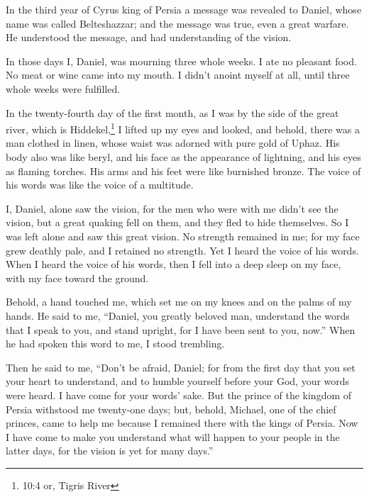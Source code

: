 \mychapter{} \myverse*{}In the third year of Cyrus king of Persia a message was revealed
to Daniel, whose name was called Belteshazzar; and the message was true, even a great warfare. He understood
the message, and had understanding of the vision.

\myverse{}In those days I, Daniel, was mourning three whole weeks.
\myverse{}I ate no pleasant food. No meat or wine came into my mouth. I didn’t anoint
myself at all, until three whole weeks were fulfilled.



\myverse{}In the twenty-fourth day of the first month, as I was by the side
of the great river, which is Hiddekel,\footnote{10:4 or, Tigris River}
\myverse{}I lifted up my eyes and looked, and behold, there was a man clothed in linen,
whose waist was adorned with pure gold of Uphaz.
\myverse{}His body also was like beryl, and his face as the appearance of lightning,
and his eyes as flaming torches. His arms and his feet were like burnished bronze. The voice of his words
was like the voice of a multitude.

\myverse{}I, Daniel, alone saw the vision, for the men who were with me
didn’t see the vision, but a great quaking fell on them, and they fled to hide themselves.
\myverse{}So I was left alone and saw this great vision. No strength remained in me;
for my face grew deathly pale, and I retained no strength.
\myverse{}Yet I heard the voice of his words. When I heard the voice of his words, then
I fell into a deep sleep on my face, with my face toward the ground.

\myverse{}Behold, a hand touched me, which set me on my knees and on the
palms of my hands.
\myverse{}He said to me, “Daniel, you greatly beloved man, understand the words that
I speak to you, and stand upright, for I have been sent to you, now.” When he had spoken this word to
me, I stood trembling.

\myverse{}Then he said to me, “Don’t be afraid, Daniel; for from the first
day that you set your heart to understand, and to humble yourself before your God, your words were heard.
I have come for your words’ sake.
\myverse{}But the prince of the kingdom of Persia withstood me twenty-one days; but,
behold, Michael, one of the chief princes, came to help me because I remained there with the kings of
Persia.
\myverse{}Now I have come to make you understand what will happen to your people in
the latter days, for the vision is yet for many days.”

